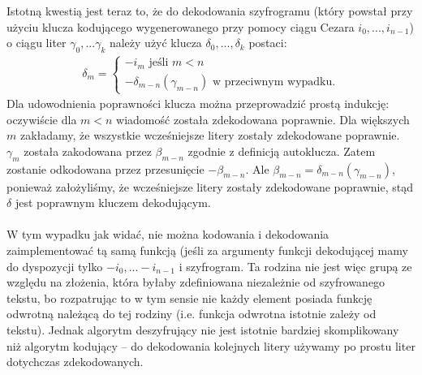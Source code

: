 \documentclass[a4paper]{article}
\theoremstyle{defn}
\theoremstyle{theorem}
\theoremstyle{lemma}
\theoremstyle{cor}
\theoremstyle{fact}
\begin{document}
Istotną kwestią jest teraz to, że do dekodowania szyfrogramu (który powstał przy użyciu klucza kodującego wygenerowanego przy pomocy ciągu Cezara $i_0, ..., i_{n-1}$) o ciągu liter $\gamma_0, ... \gamma_k$ należy użyć klucza $\delta_0, ..., \delta_k$ postaci:
\begin{align*}
\delta_m =
\begin{cases}
  -i_m \text{ jeśli } m < n  \\
  -\delta_{m-n}(\gamma_{m-n}) \text{ w przeciwnym wypadku}.
\end{cases}
\end{align*}
Dla udowodnienia poprawności klucza można przeprowadzić prostą indukcję: oczywiście dla $m < n$ wiadomość została zdekodowana poprawnie. Dla większych $m$ zakładamy, że wszystkie wcześniejsze litery zostały zdekodowane poprawnie. $\gamma_m$ została zakodowana przez $\beta_{m-n}$ zgodnie z definicją autoklucza. Zatem zostanie odkodowana przez przesunięcie $-\beta_{m-n}$. Ale $\beta_{m-n} = \delta_{m-n}(\gamma_{m-n})$, ponieważ założyliśmy, że wcześniejsze litery zostały zdekodowane poprawnie, stąd $\delta$ jest poprawnym kluczem dekodującym. \\\\
W tym wypadku jak widać, nie można kodowania i dekodowania zaimplementować tą samą funkcją (jeśli za argumenty funkcji dekodującej mamy do dyspozycji tylko $-i_0, ... -i_{n-1}$ i szyfrogram. Ta rodzina nie jest więc grupą ze względu na złożenia, która byłaby zdefiniowana niezależnie od szyfrowanego tekstu, bo rozpatrując to w tym sensie nie każdy element posiada funkcję odwrotną należącą do tej rodziny (i.e. funkcja odwrotna istotnie zależy od tekstu). Jednak algorytm deszyfrujący nie jest istotnie bardziej skomplikowany niż algorytm kodujący – do dekodowania kolejnych litery używamy po prostu liter dotychczas zdekodowanych. \\
\end{document}
